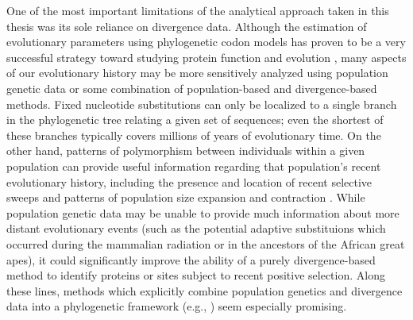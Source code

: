 One of the most important limitations of the analytical approach taken
in this thesis was its sole reliance on divergence data. Although the
estimation of evolutionary parameters using phylogenetic codon models
has proven to be a very successful strategy toward studying protein
function and evolution \citep{Yang2005c}, many aspects of our
evolutionary history may be more sensitively analyzed using population
genetic data or some combination of population-based and
divergence-based methods. Fixed nucleotide substitutions can only be
localized to a single branch in the phylogenetic tree relating a given
set of sequences; even the shortest of these branches typically covers
millions of years of evolutionary time. On the other hand, patterns of
polymorphism between individuals within a given population can provide
useful information regarding that population's recent evolutionary
history, including the presence and location of recent selective
sweeps \citep{Hernandez2011} and patterns of population size expansion
and contraction \citep{Pool2010}. While population genetic data may be
unable to provide much information about more distant evolutionary
events (such as the potential adaptive substituions which occurred
during the mammalian radiation or in the ancestors of the African
great apes), it could significantly improve the ability of a purely
divergence-based method to identify proteins or sites subject to
recent positive selection. Along these lines, methods which explicitly
combine population genetics and divergence data into a phylogenetic
framework (e.g., \citet{Wilson2011}) seem especially promising.


